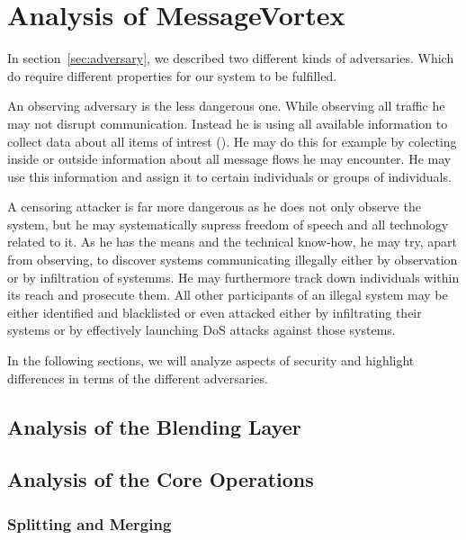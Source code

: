 \part{Analysis of MessageVortex}
In section~\ref{sec:adversary}, we described two different kinds of adversaries. Which do require different properties for our system to be fulfilled.

An observing adversary is the less dangerous one. While observing all traffic he may not disrupt communication. Instead he is using all available information to collect data about all items of intrest (). He may do this for example by colecting inside or outside information about all message flows he may encounter. He may use this information and assign it to certain individuals or groups of individuals.

A censoring attacker is far more dangerous as he does not only observe the system, but he may systematically supress freedom of speech and all technology related to it. As he has the means and the technical know-how, he may try, apart from observing, to discover systems communicating illegally either by observation or by infiltration of systemms. He may furthermore track down individuals within its reach and prosecute them. All other participants of an illegal system may be either identified and blacklisted or even attacked either by infiltrating their systems or by effectively launching DoS attacks against those systems.

In the following sections, we will analyze aspects of security and highlight differences in terms of the different adversaries.



\chapter{Analysis of the Blending Layer}
\chapter{Analysis of the Core Operations}
\section{Splitting and Merging}
